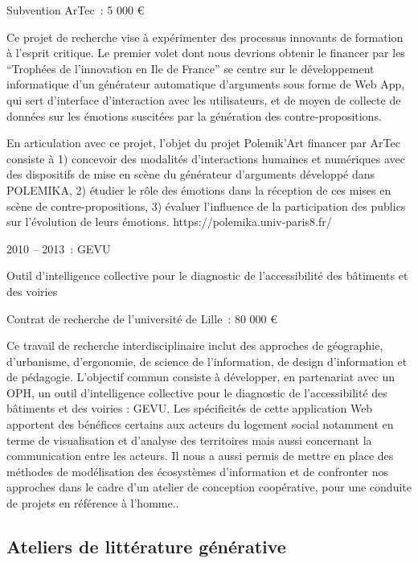 \documentclass[
  letterpaper,
  DIV=11,
  numbers=noendperiod]{scrreprt}
\begin{document}
Subvention ArTec~: 5 000 €

Ce projet de recherche vise à expérimenter des processus innovants de
formation à l'esprit critique. Le premier volet dont nous devrions
obtenir le financer par les ``Trophées de l'innovation en Ile de
France'' se centre sur le développement informatique d'un générateur
automatique d'arguments sous forme de Web App, qui sert d'interface
d'interaction avec les utilisateurs, et de moyen de collecte de données
sur les émotions suscitées par la génération des contre-propositions.

En articulation avec ce projet, l'objet du projet Polemik'Art financer
par ArTec consiste à 1) concevoir des modalités d'interactions humaines
et numériques avec des dispositifs de mise en scène du générateur
d'arguments développé dans POLEMIKA, 2) étudier le rôle des émotions
dans la réception de ces mises en scène de contre-propositions, 3)
évaluer l'influence de la participation des publics sur l'évolution de
leurs émotions. https://polemika.univ-paris8.fr/

2010 -- 2013~: GEVU

Outil d'intelligence collective pour le diagnostic de l'accessibilité
des bâtiments et des voiries

Contrat de recherche de l'université de Lille~: 80 000 €~

Ce travail de recherche interdisciplinaire inclut des approches de
géographie, d'urbanisme, d'ergonomie, de science de l'information, de
design d'information et de pédagogie. L'objectif commun consiste à
développer, en partenariat avec un OPH, un outil d'intelligence
collective pour le diagnostic de l'accessibilité des bâtiments et des
voiries : GEVU. Les spécificités de cette application Web apportent des
bénéfices certains aux acteurs du logement social notamment en terme de
visualisation et d'analyse des territoires mais aussi concernant la
communication entre les acteurs. Il nous a aussi permis de mettre en
place des méthodes de modélisation des écosystèmes d'information et de
confronter nos approches dans le cadre d'un atelier de conception
coopérative, pour une conduite de projets en référence à l'homme..

\hypertarget{ateliers-de-littuxe9rature-guxe9nuxe9rative}{%
\subsection{Ateliers de littérature
générative}\label{ateliers-de-littuxe9rature-guxe9nuxe9rative}}
\end{document}
